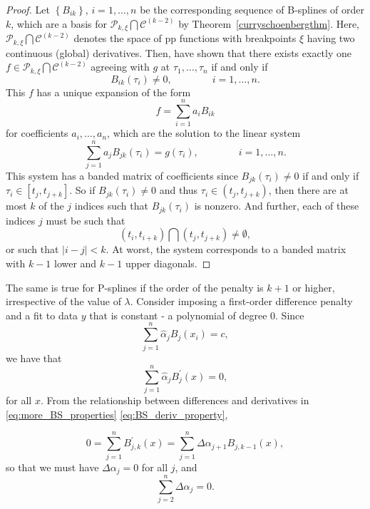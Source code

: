 \documentclass[12pt]{article}
\newcommand{\PP}{\mathcal{P}}
\theoremstyle{definition}
\begin{document}
\begin{enumerate}
\begin{description}
\begin{proof}
Let $\left\{ B_{ik} \right\}$, $i=1,\dots,n$ be the corresponding sequence of B-splines of order $k$, which are a basis for $\PP_{k,\xi} \bigcap \mathscr{C}^{\left(k-2\right)}$ by Theorem~\ref{curryschoenbergthm}. Here, $\PP_{k,\xi} \bigcap \mathscr{C}^{\left(k-2\right)}$ denotes the space of pp functions with breakpoints $\xi$ having two continuous (global) derivatives. Then, \cite{schoenberg1953polya} have shown that there exists exactly one $f \in \PP_{k,\xi} \bigcap \mathscr{C}^{\left(k-2\right)}$ agreeing with $g$ at $\tau_1,\dots, \tau_n$ if and only if 
\[
B_{ik}\left(\tau_i\right) \ne 0, \qquad \qquad i=1,\dots,n.
\]
This $f$ has a unique expansion of the form
\[
f = \sum_{i=1}^n a_i B_{ik}
\] 
for coefficients $a_i,\dots, a_n$, which are the solution to the linear system
\[
\sum_{j=1}^n a_jB_{jk}\left(\tau_i\right) = g\left(\tau_i\right), \qquad \qquad i=1,\dots,n.
\]
This system has a banded matrix of coefficients since $B_{jk}\left(\tau_i\right) \ne 0$ if and only if $\tau_i \in \left[t_j,t_{j+k}\right]$. So if $B_{jk}\left(\tau_i\right) \ne 0$ and thus $\tau_i \in \left(t_j,t_{j+k}\right)$, then there are at most $k$ of the $j$ indices such that $B_{jk}\left(\tau_i\right)$ is nonzero. And further, each of these indices $j$ must be such that 
\[
\left(t_i,t_{i+k}\right) \bigcap \left(t_j,t_{j+k}\right) \ne \emptyset,
\]
or such that $\vert i-j \vert < k$. At worst, the system corresponds to a banded matrix with $k-1$ lower and $k-1$ upper diagonals. 
\end{proof}
The same is true for P-splines if the order of the penalty is $k+1$ or higher, irrespective of the value of $\lambda$. Consider imposing a first-order difference penalty and a fit to data $y$ that is constant - a polynomial of degree 0. Since 
\[
\sum_{j=1}^n \hat{\alpha}_j B_j\left( x_i \right) = c, 
\]
\noindent
we have that
\[
\sum_{j=1}^n \hat{\alpha}_j B^\prime_j\left( x \right) = 0, 
\]
\noindent
for all $x$. From the relationship between differences and derivatives in \ref{eq:more_BS_properties} \ref{eq:BS_deriv_property}, 

\[
0 = \sum_{j=1}^n B^\prime_{j,k}\left(x\right) = \sum_{j=1}^n \Delta\alpha_{j+1} B_{j,k-1}\left( x \right), 
\]
\noindent
so that we must have $\Delta \alpha_j = 0$ for all $j$, and 
\[
\sum_{j=2}^n \Delta \alpha_j = 0.
\]


\end{description}
\end{enumerate}
\end{document}
